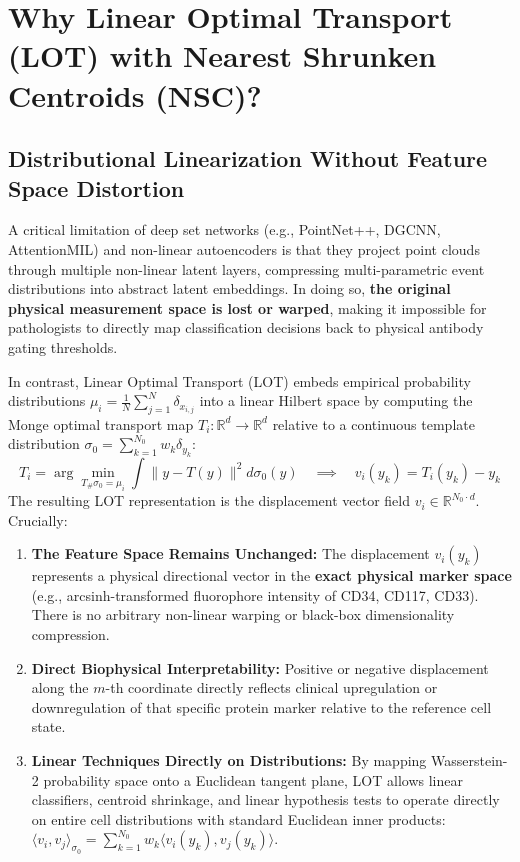 \documentclass[10pt]{article}
\begin{document}
\section{Why Linear Optimal Transport (LOT) with Nearest Shrunken Centroids (NSC)?}

\subsection{Distributional Linearization Without Feature Space Distortion}
A critical limitation of deep set networks (e.g., PointNet++, DGCNN, AttentionMIL) and non-linear autoencoders is that they project point clouds through multiple non-linear latent layers, compressing multi-parametric event distributions into abstract latent embeddings. In doing so, \textbf{the original physical measurement space is lost or warped}, making it impossible for pathologists to directly map classification decisions back to physical antibody gating thresholds.

In contrast, Linear Optimal Transport (LOT) embeds empirical probability distributions $\mu_i = \frac{1}{N} \sum_{j=1}^N \delta_{x_{i,j}}$ into a linear Hilbert space by computing the Monge optimal transport map $T_i: \mathbb{R}^d \to \mathbb{R}^d$ relative to a continuous template distribution $\sigma_0 = \sum_{k=1}^{N_0} w_k \delta_{y_k}$:
\begin{equation}
T_i = \arg\min_{T_\# \sigma_0 = \mu_i} \int \|y - T(y)\|^2 d\sigma_0(y) \quad \implies \quad v_i(y_k) = T_i(y_k) - y_k
\end{equation}
The resulting LOT representation is the displacement vector field $v_i \in \mathbb{R}^{N_0 \cdot d}$. Crucially:
\begin{enumerate}\setlength{\itemsep}{1pt}\setlength{\parskip}{0pt}
    \item \textbf{The Feature Space Remains Unchanged:} The displacement $v_i(y_k)$ represents a physical directional vector in the \textbf{exact physical marker space} (e.g., arcsinh-transformed fluorophore intensity of CD34, CD117, CD33). There is no arbitrary non-linear warping or black-box dimensionality compression.
    \item \textbf{Direct Biophysical Interpretability:} Positive or negative displacement along the $m$-th coordinate directly reflects clinical upregulation or downregulation of that specific protein marker relative to the reference cell state.
    \item \textbf{Linear Techniques Directly on Distributions:} By mapping Wasserstein-2 probability space onto a Euclidean tangent plane, LOT allows linear classifiers, centroid shrinkage, and linear hypothesis tests to operate directly on entire cell distributions with standard Euclidean inner products: $\langle v_i, v_j \rangle_{\sigma_0} = \sum_{k=1}^{N_0} w_k \langle v_i(y_k), v_j(y_k) \rangle$.
\end{enumerate}
\end{document}
